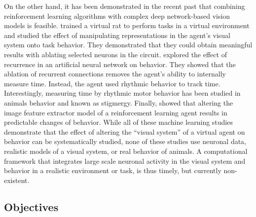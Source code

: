 \documentclass[B2,COG]{ercgrant}
\begin{document}
On the other hand, it has been demonstrated in the recent past that combining reinforcement learning algorithms with complex deep network-based vision models is feasible. 
\textcite{Merel2020-hf} trained a virtual rat to perform tasks in a virtual environment and studied the effect of manipulating representations in the agent's visual system onto task behavior. They demonstrated that they could obtain meaningful results with ablating selected neurons in the circuit. 
\textcite{Deverett2019-gs} explored the effect of recurrence in an artificial neural network on behavior. 
They showed that the ablation of recurrent connections removes the agent's ability to internally measure time. Instead, the agent used rhythmic behavior to track time. 
Interestingly, measuring time by rhythmic motor behavior has been studied in animals behavior and known as stigmergy.
Finally, \textcite{Hilton2020-jz} showed that altering the image feature extractor model of a reinforcement learning agent results in predictable changes of behavior.
While all of these machine learning studies demonstrate that the effect of altering the ``visual system'' of a virtual agent on behavior can be systematically studied, none of these studies use neuronal data, realistic models of a visual system, or real behavior of animals. 
A computational framework that integrates large scale neuronal activity in the visual system and behavior in a realistic environment or task, is thus timely, but currently non-existent. 

\subsection{Objectives}
\end{document}
